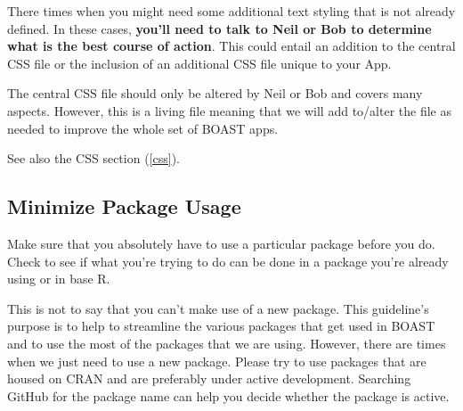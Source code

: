 \documentclass[
]{book}
\newenvironment{Shaded}{\begin{snugshade}}{\end{snugshade}}
\newcommand{\CommentTok}[1]{\textcolor[rgb]{0.56,0.35,0.01}{\textit{#1}}}
\newcommand{\DataTypeTok}[1]{\textcolor[rgb]{0.13,0.29,0.53}{#1}}
\newcommand{\DecValTok}[1]{\textcolor[rgb]{0.00,0.00,0.81}{#1}}
\newcommand{\KeywordTok}[1]{\textcolor[rgb]{0.13,0.29,0.53}{\textbf{#1}}}
\newcommand{\NormalTok}[1]{#1}
\newcommand{\OperatorTok}[1]{\textcolor[rgb]{0.81,0.36,0.00}{\textbf{#1}}}
\newcommand{\StringTok}[1]{\textcolor[rgb]{0.31,0.60,0.02}{#1}}
\begin{document}
\begin{Shaded}
\end{Shaded}

There times when you might need some additional text styling that is not already defined. In these cases, \textbf{you'll need to talk to Neil or Bob to determine what is the best course of action}. This could entail an addition to the central CSS file or the inclusion of an additional CSS file unique to your App.

The central CSS file should only be altered by Neil or Bob and covers many aspects. However, this is a living file meaning that we will add to/alter the file as needed to improve the whole set of BOAST apps.

See also the CSS section (\ref{css}).

\hypertarget{minPackages}{%
\subsection{Minimize Package Usage}\label{minPackages}}

Make sure that you absolutely have to use a particular package before you do. Check to see if what you're trying to do can be done in a package you're already using or in base R.

This is not to say that you can't make use of a new package. This guideline's purpose is to help to streamline the various packages that get used in BOAST and to use the most of the packages that we are using. However, there are times when we just need to use a new package. Please try to use packages that are housed on CRAN and are preferably under active development. Searching GitHub for the package name can help you decide whether the package is active.
\end{document}
